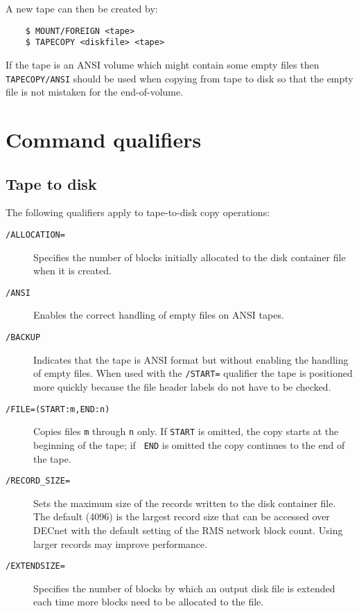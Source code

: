 A new tape can then be created by:
\begin{verbatim}
    $ MOUNT/FOREIGN <tape>
    $ TAPECOPY <diskfile> <tape>
\end{verbatim}

If the tape is an ANSI volume which might contain some empty files then {\tt
TAPECOPY/ANSI} should be used when copying from tape to disk so that the empty
file is not mistaken for the end-of-volume.

\section{Command qualifiers}
\subsection{Tape to disk}

The following qualifiers apply to tape-to-disk copy operations:
\begin{description}

\item[\tt/ALLOCATION=] Specifies the number of blocks initially allocated
to the disk container file when it is created.

\item[\tt/ANSI] Enables the correct handling of empty files on ANSI tapes.

\item[\tt/BACKUP] Indicates that the tape is ANSI format but without enabling
the handling of empty files. When used with the {\tt/START=} qualifier the tape
is positioned more quickly because the file header labels do not have to be
checked.

\item[\tt/FILE=(START:m,END:n)] Copies files {\tt m} through {\tt n} only. If
{\tt START} is omitted, the copy starts at the beginning of the tape; if {\tt
END} is omitted the copy continues to the end of the tape.

\item[\tt/RECORD\_SIZE=] Sets the maximum size of the records written to the disk
container file. The default (4096) is the largest record size that can be
accessed over DECnet with the default setting of the RMS network block count.
Using larger records may improve performance.

\item[\tt/EXTENDSIZE=] Specifies the number of blocks by which an output disk
file is extended each time more blocks need to be allocated to the file.

\end{description}

